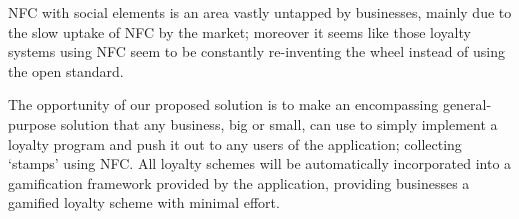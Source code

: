 NFC with social elements is an area vastly untapped by businesses, mainly due to the slow uptake of NFC by the market; moreover it seems like those loyalty systems using NFC seem to be constantly re-inventing the wheel instead of using the open standard.

The opportunity of our proposed solution is to make an encompassing general-purpose solution that any business, big or small, can use to simply implement a loyalty program and push it out to any users of the application; collecting `stamps' using NFC. All loyalty schemes will be automatically incorporated into a gamification framework provided by the application, providing businesses a gamified loyalty scheme with minimal effort.